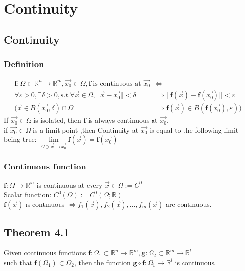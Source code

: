 \documentclass[11pt, a4paper]{article}
\begin{document}
\section{Continuity}
    \subsection{Continuity}
        \subsubsection{Definition}
        $$\begin{aligned}
            \bm{f}: \Omega \subset \mathbb{R}^n \to \mathbb{R}^m, \vec{x_0} \in \Omega, \bm{f} \text{ is continuous at } \vec{x_0} &\Leftrightarrow \\
            \forall \varepsilon > 0, \exists \delta > 0, s.t. \forall \vec{x} \in \Omega, ||\vec{x} - \vec{x_0}|| < \delta &\Rightarrow ||\bm{f}(\vec{x}) - \bm{f}(\vec{x_0})|| < \varepsilon \\
            (\vec{x} \in B(\vec{x_0}, \delta) \cap \Omega &\Rightarrow \bm{f}(\vec{x}) \in B(\bm{f}(\vec{x_0}), \varepsilon))
        \end{aligned}$$
        If $\vec{x_0} \in \Omega$ is isolated, then $\bm{f}$ is always continuous at $\vec{x_0}$. \\
        if $\vec{x_0} \in \Omega$ is a limit point ,then Continuity at $\vec{x_0}$ is equal to the following limit being true: $\lim\limits_{\Omega \ni \vec{x} \to \vec{x_0}}\bm{f}(\vec{x}) = \bm{f}(\vec{x_0})$
        \subsubsection{Continuous function}
        $\bm{f}: \Omega \to \mathbb{R}^m$ is continuous at every $\vec{x} \in \Omega := C^0$ \\
        Scalar function: $C^0(\Omega) := C^0(\Omega; \mathbb{R})$ \\
        $\bm{f}(\vec{x})$ is continuous $\Leftrightarrow f_1(\vec{x}), f_2(\vec{x}), ..., f_m(\vec{x})$ are continuous.
    \subsection{Theorem 4.1}
    Given continuous functions $\bm{f}: \Omega_1 \subset \mathbb{R}^n \to \mathbb{R}^m, \bm{g}: \Omega_2 \subset \mathbb{R}^m \to \mathbb{R}^l$ \\
    such that $\bm{f}(\Omega_1) \subset \Omega_2$, then the function $\bm{g} \circ \bm{f}: \Omega_1 \to \mathbb{R}^l$ is continuous.
\end{document}

